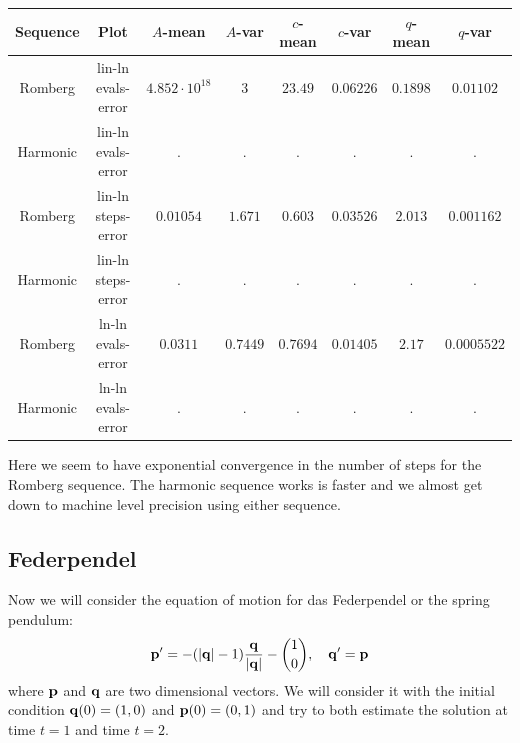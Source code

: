 \begin{table}[H]
    \centering
    \small
     \begin{tabular}{c|c||c|c|c|c|c|c}
Sequence & Plot & \(A\)-mean & \(A\)-var & \(c\)-mean & \(c\)-var & \(q\)-mean & \(q\)-var\\\hline
Romberg & lin-ln evals-error & \(4.852\cdot 10^{18}\) & \(3\) & \(23.49\) & \(0.06226\) & \(0.1898\) & \(0.01102\) \\
Harmonic & lin-ln evals-error & . & . & . & . & . & . \\
Romberg & lin-ln steps-error & \(0.01054\) & \(1.671\) & \(0.603\) & \(0.03526\) & \(2.013\) & \(0.001162\) \\
Harmonic & lin-ln steps-error & . & . & . & . & . & . \\
Romberg & ln-ln evals-error & \(0.0311\) & \(0.7449\) & \(0.7694\) & \(0.01405\) & \(2.17\) & \(0.0005522\) \\
Harmonic & ln-ln evals-error & . & . & . & . & . & . \\
    \end{tabular}
    \label{tab:my_label}
\end{table}

Here we seem to have exponential convergence in the number of steps for the Romberg sequence. The harmonic sequence works is faster and we almost get down to machine level precision using either sequence. 

\subsection{Federpendel}

Now we will consider the equation of motion for das Federpendel or the spring pendulum:
\[
\mathbf{p}' = -(|\mathbf{q}| - 1)\frac{\mathbf{q}}{|\mathbf{q}|} - {1\choose 0}, \quad \mathbf{q}' = \mathbf{p}
\]
where \(\mathbf{p}\) and \(\mathbf{q}\) are two dimensional vectors. We will consider it with the initial condition \(\mathbf{q}(0) = (1,0)\) and \(\mathbf{p}(0) = (0,1)\) and try to both estimate the solution at time \(t = 1\) and time \(t = 2\).

